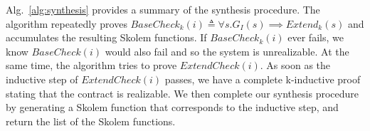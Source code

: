 Alg.~\ref{alg:synthesis} provides a summary of the synthesis
procedure. The algorithm repeatedly proves $\mathit{BaseCheck_k(i)}
\triangleq \forall s. G_I(s) \implies \mathit{Extend}_k(s)$ and
accumulates the resulting Skolem functions. If
$\mathit{BaseCheck_k(i)}$ ever fails, we know $\mathit{BaseCheck(i)}$
would also fail and so the system is unrealizable. At the same time,
the algorithm tries to prove $\mathit{ExtendCheck(i)}$. As soon as the
inductive step of $\mathit{ExtendCheck(i)}$ passes, we have a complete
k-inductive proof stating that the contract is realizable. We then
complete our synthesis procedure by generating a Skolem function that
corresponds to the inductive step, and return the list of the Skolem
functions.

\begin{figure}[t]
\begin{minipage}{0.65\textwidth}
\end{minipage}%
\begin{minipage}{0.40\textwidth}
\end{minipage}
\end{figure}

